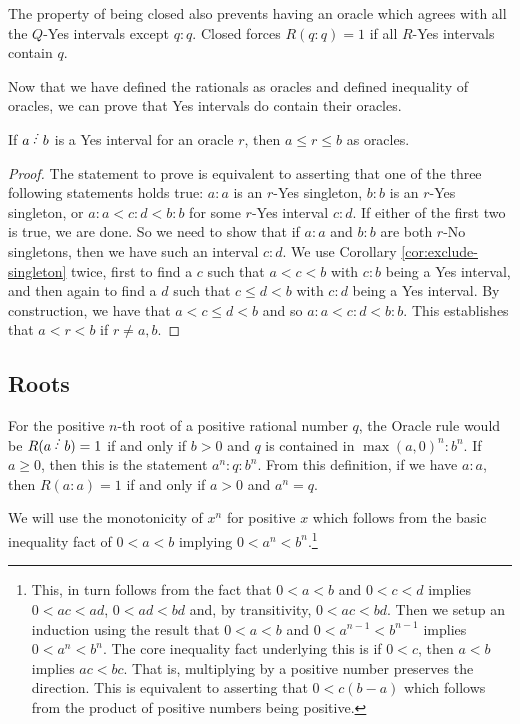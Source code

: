 \documentclass[12pt]{article}
\begin{document}
The property of being closed also prevents having an oracle which agrees with all the $Q$-Yes intervals except $q:q$. Closed forces $R(q:q)=1$ if all $R$-Yes intervals contain $q$.

Now that we have defined the rationals as oracles and defined inequality of oracles, we can prove that Yes intervals do contain their oracles.

\begin{proposition}\label{pr:yes-trap}
    If $a\lte b$ is a Yes interval for an oracle $r$, then $a \leq r \leq b$ as oracles.
\end{proposition}

\begin{proof}
    The statement to prove is equivalent to asserting that one of the three following statements holds true: $a:a$ is an $r$-Yes singleton,  $b:b$ is an $r$-Yes singleton, or $a:a < c:d < b:b$ for some $r$-Yes interval $c:d$.  If either of the first two is true, we are done. So we need to show that if $a:a$ and $b:b$ are both $r$-No singletons, then we have such an interval $c:d$. We use Corollary \ref{cor:exclude-singleton} twice, first to find a $c$ such that $a < c < b$ with $c:b$ being a Yes interval, and then again to find a $d$ such that $c \leq d < b$ with $c:d$ being a Yes interval. By construction, we have that $a < c \leq d < b$ and so $a:a < c:d < b:b$. This establishes that $a < r < b$ if $r \neq a, b$.  
\end{proof}


\subsection{Roots}\label{sec:roots}

For the positive $n$-th root of a positive rational number $q$, the Oracle rule would be $R(a\lte b) = 1$ if and only if $b> 0$ and $q$ is contained in $\max(a,0)^n:b^n$. If $a\geq 0$, then this is the statement $a^n:q:b^n$. From this definition, if we have $a:a$, then $R(a:a) = 1$ if and only if $a>0$ and $a^n = q$.

We will use the monotonicity of $x^n$ for positive $x$ which follows from the basic inequality fact of $ 0 < a < b$ implying $0 < a^n < b^n$.\footnote{This, in turn follows from the fact that $0<a<b$ and $0<c<d$ implies $0<ac<ad$, $0<ad<bd$ and, by transitivity, $0<ac<bd$. Then we setup an induction using the result that $0 < a<b$ and $0 < a^{n-1} < b^{n-1}$ implies $0 < a^n < b^n$. The core inequality fact underlying this is if $0<c$, then $a<b$ implies $ac < bc$. That is, multiplying by a positive number preserves the direction. This is equivalent to asserting that $0 < c (b-a)$ which follows from the product of positive numbers being positive.}
\end{document}
